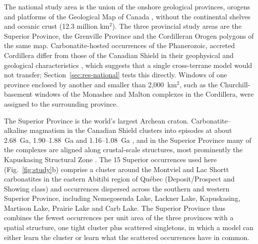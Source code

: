 \documentclass[pdflatex,sn-apa]{sn-jnl}
\begin{document}
The national study area is the union of the onshore geological provinces, orogens and platforms of the Geological Map of Canada \citep[Map 1860A;][]{Wheeler1996}, without the continental shelves and oceanic crust (12.3 million km$^2$). The three provincial study areas are the Superior Province, the Grenville Province and the Cordilleran Orogen polygons of the same map. Carbonatite-hosted occurrences of the Phanerozoic, accreted Cordillera differ from those of the Canadian Shield in their geophysical and geological characteristics \citep{Parsa2024}, which suggests that a single cross-terrane model would not transfer; Section~\ref{sec:res-national} tests this directly. Windows of one province enclosed by another and smaller than 2,000~km$^2$, such as the Churchill-basement windows of the Monashee and Malton complexes in the Cordillera, were assigned to the surrounding province.

The Superior Province is the world's largest Archean craton. Carbonatite--alkaline magmatism in the Canadian Shield clusters into episodes at about 2.68~Ga, 1.90--1.88~Ga and 1.16--1.08~Ga \citep{Rukhlov2010}, and in the Superior Province many of the complexes are aligned along crustal-scale structures, most prominently the Kapuskasing Structural Zone \citep[KSZ;][]{Percival1994,Gittins1967}. The 15 Superior occurrences used here (Fig.~\ref{fig:study}b) comprise a cluster around the Montviel and Lac Shortt carbonatites in the eastern Abitibi region of Qu\'ebec (Deposit/Prospect and Showing class) and occurrences dispersed across the southern and western Superior Province, including Nemegosenda Lake, Lackner Lake, Kapuskasing, Martison Lake, Prairie Lake and Carb Lake. The Superior Province thus combines the fewest occurrences per unit area of the three provinces with a spatial structure, one tight cluster plus scattered singletons, in which a model can either learn the cluster or learn what the scattered occurrences have in common.
\end{document}
